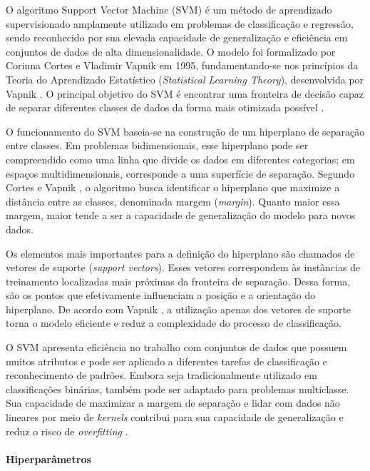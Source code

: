 \documentclass[
    12pt,                %
    openright,           %
    oneside,             %
    a4paper,             %
    english,             %
    brazil               %
]{abntex2}
\begin{document}
O algoritmo Support Vector Machine (SVM) é um método de aprendizado supervisionado amplamente utilizado em problemas de classificação e regressão, sendo reconhecido por sua elevada capacidade de generalização e eficiência em conjuntos de dados de alta dimensionalidade. O modelo foi formalizado por Corinna Cortes e Vladimir Vapnik em 1995, fundamentando-se nos princípios da Teoria do Aprendizado Estatístico (\textit{Statistical Learning Theory}), desenvolvida por Vapnik \cite{vapnik1998}. O principal objetivo do SVM é encontrar uma fronteira de decisão capaz de separar diferentes classes de dados da forma mais otimizada possível \cite{cortespvapnik1995}.

O funcionamento do SVM baseia-se na construção de um hiperplano de separação entre classes. Em problemas bidimensionais, esse hiperplano pode ser compreendido como uma linha que divide os dados em diferentes categorias; em espaços multidimensionais, corresponde a uma superfície de separação. Segundo Cortes e Vapnik \cite{cortespvapnik1995}, o algoritmo busca identificar o hiperplano que maximize a distância entre as classes, denominada margem (\textit{margin}). Quanto maior essa margem, maior tende a ser a capacidade de generalização do modelo para novos dados.

Os elementos mais importantes para a definição do hiperplano são chamados de vetores de suporte (\textit{support vectors}). Esses vetores correspondem às instâncias de treinamento localizadas mais próximas da fronteira de separação. Dessa forma, são os pontos que efetivamente influenciam a posição e a orientação do hiperplano. De acordo com Vapnik \cite{vapnik1998}, a utilização apenas dos vetores de suporte torna o modelo eficiente e reduz a complexidade do processo de classificação.

O SVM apresenta eficiência no trabalho com conjuntos de dados que possuem muitos atributos e pode ser aplicado a diferentes tarefas de classificação e reconhecimento de padrões. Embora seja tradicionalmente utilizado em classificações binárias, também pode ser adaptado para problemas multiclasse. Sua capacidade de maximizar a margem de separação e lidar com dados não lineares por meio de \textit{kernels} contribui para sua capacidade de generalização e reduz o risco de \textit{overfitting} \cite{cortespvapnik1995,vapnik1998}.

\paragraph{Hiperparâmetros}
\end{document}
